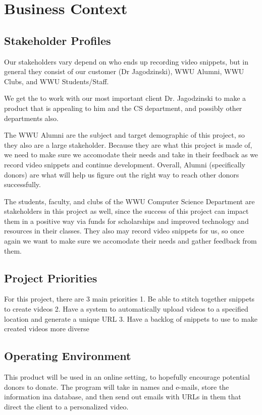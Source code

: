 \section{Business Context}

\subsection{Stakeholder Profiles}

Our stakeholders vary depend on who ends up recording video snippets, but in general they consist of our customer (Dr Jagodzinski), 
WWU Alumni, WWU Clubs, and WWU Students/Staff.

We get the to work with our most important client Dr. Jagodzinski to make a product that 
is appealing to him and the CS department, and possibly other departments also.

The WWU Alumni are the subject and target demographic of this project, so they also are a large stakeholder. Because they are
what this project is made of, we need to make sure we accomodate their needs and take in their feedback as we record video snippets and 
continue development. Overall, Alumni (specifically donors) are what will help us figure out the right way to reach other donors successfully.

The students, faculty, and clubs of the WWU Computer Science Department are stakeholders in this project as well, since the success of this project can impact 
them in a positive way via funds for scholarships and improved technology and resources in their classes. 
They also may record video snippets for us, so once again we want to make sure we accomodate their needs and gather feedback from them.

\subsection{Project Priorities}

For this project, there are 3 main priorities
1. Be able to stitch together snippets to create videos
2. Have a system to automatically upload videos to a specified location and generate a unique URL
3. Have a backlog of snippets to use to make created videos more diverse

\subsection{Operating Environment}

This product will be used in an online setting, to hopefully encourage potential donors to donate. 
The program will take in names and e-mails, store the information ina database, and then send out emails with URLs in 
them that direct the client to a personalized video.
